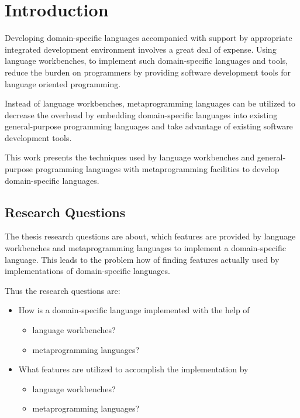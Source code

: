 \chapter{Introduction}
\label{c:introduction}

Developing domain-specific languages accompanied with support by appropriate integrated development environment involves a great deal of expense.
Using language workbenches, to implement such domain-specific languages and tools, reduce the burden on programmers by providing software development tools for language oriented programming.

Instead of language workbenches, metaprogramming languages can be utilized to decrease the overhead by embedding domain-specific languages into existing general-purpose programming languages and take advantage of existing software development tools.

This work presents the techniques used by language workbenches and general-purpose programming languages with metaprogramming facilities to develop domain-specific languages.

\section{Research Questions} 

The thesis research questions are about, which features are provided by language workbenches and metaprogramming languages to implement a domain-specific language.
This leads to the problem how of finding features actually used by implementations of domain-specific languages.

Thus the research questions are:

\begin{itemize} 
	\item How is a domain-specific language implemented with the help of
	\begin{itemize}
		\item language workbenches?
		\item metaprogramming languages?
	\end{itemize}
	\item What features are utilized to accomplish the implementation by
	\begin{itemize}
		\item language workbenches?
		\item metaprogramming languages?
	\end{itemize}
\end{itemize}


